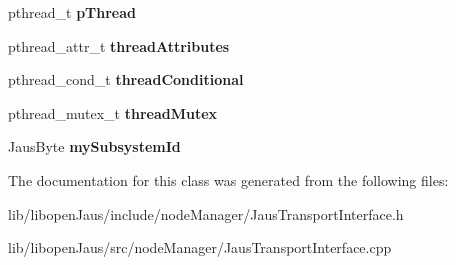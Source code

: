 \begin{DoxyCompactItemize}
\item 
\hypertarget{class_jaus_transport_interface_ae80a67566391f8652f8e4666f4692053}{pthread\-\_\-t {\bfseries p\-Thread}}\label{class_jaus_transport_interface_ae80a67566391f8652f8e4666f4692053}

\item 
\hypertarget{class_jaus_transport_interface_a984fe46c34f8bb55aa6f0a71e1abb1b0}{pthread\-\_\-attr\-\_\-t {\bfseries thread\-Attributes}}\label{class_jaus_transport_interface_a984fe46c34f8bb55aa6f0a71e1abb1b0}

\item 
\hypertarget{class_jaus_transport_interface_a61905e1222b6d9047d01b92d0170a6aa}{pthread\-\_\-cond\-\_\-t {\bfseries thread\-Conditional}}\label{class_jaus_transport_interface_a61905e1222b6d9047d01b92d0170a6aa}

\item 
\hypertarget{class_jaus_transport_interface_a536d652e34ce8a3bfe633285f2e360c7}{pthread\-\_\-mutex\-\_\-t {\bfseries thread\-Mutex}}\label{class_jaus_transport_interface_a536d652e34ce8a3bfe633285f2e360c7}

\item 
\hypertarget{class_jaus_transport_interface_adfba19e1f78bf771d05419e71560e35c}{\-Jaus\-Byte {\bfseries my\-Subsystem\-Id}}\label{class_jaus_transport_interface_adfba19e1f78bf771d05419e71560e35c}

\end{DoxyCompactItemize}


\-The documentation for this class was generated from the following files\-:\begin{DoxyCompactItemize}
\item 
lib/libopen\-Jaus/include/node\-Manager/\-Jaus\-Transport\-Interface.\-h\item 
lib/libopen\-Jaus/src/node\-Manager/\-Jaus\-Transport\-Interface.\-cpp\end{DoxyCompactItemize}
